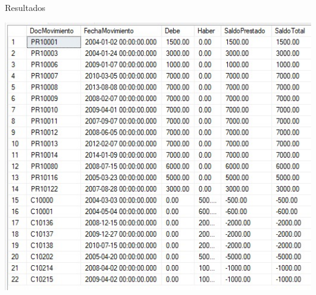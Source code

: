 \documentclass[a4paper]{article}
\begin{document}
\newpage
Resultados 
\begin{center}
\includegraphics[width=16cm]{./src/2.jpeg}
\end{center}
\newpage
\end{document}
